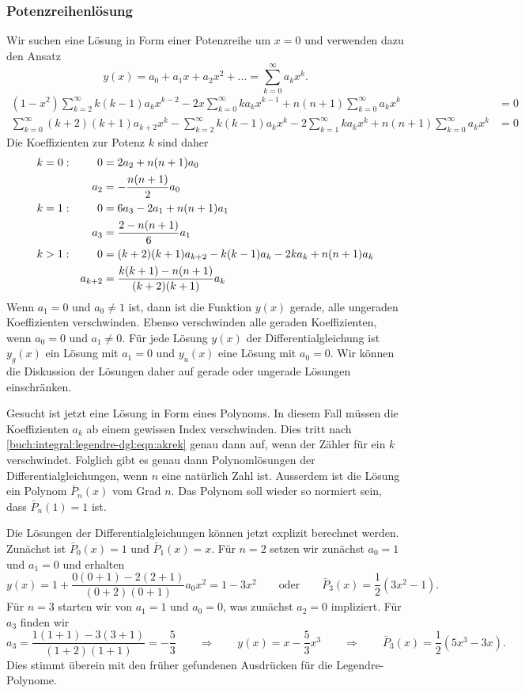 %
%
\subsubsection{Potenzreihenlösung}
Wir suchen eine Lösung in Form einer Potenzreihe um $x=0$ und 
verwenden dazu den Ansatz
\[
y(x) = a_0+a_1x+a_2x^2+ \dots = \sum_{k=0}^\infty a_kx^k.
\]
\begin{align*}
(1-x^2) \sum_{k=2}^\infty k(k-1)a_kx^{k-2}
-2x\sum_{k=0}^\infty ka_kx^{k-1}
+
n(n+1)\sum_{k=0}^\infty  a_kx^k
&=
0
\\
\sum_{k=0}^\infty (k+2)(k+1)a_{k+2}x^k
-
\sum_{k=2}^\infty k(k-1)a_kx^k
-
2\sum_{k=1}^\infty ka_kx^k
+
n(n+1)\sum_{k=0}^\infty  a_kx^k
&=
0
\end{align*}
Die Koeffizienten zur Potenz $k$ sind daher
\begin{align}
k&=0:
&
0&=
2a_2+n(n+1)a_0
\notag
\\
&&
a_2&=-\frac{n(n+1)}{2}a_0
\notag
\\
k&=1:
&
0&=
6a_3-2a_1+n(n+1)a_1
\notag
\\
&&
a_3&= \frac{2-n(n+1)}{6}a_1
\notag
\\
k&>1:
&
0&=
(k+2)(k+1)a_{k+2} -k(k-1)a_k -2ka_k +n(n+1) a_k
\notag
\\
&&
a_{k+2}
&=
\frac{ k(k+1)-n(n+1) }{(k+2)(k+1)}
a_k
\label{buch:integral:legendre-dgl:eqn:akrek}
\end{align}
Wenn $a_1=0$ und $a_0\ne 1$ ist, dann ist die Funktion $y(x)$ gerade,
alle ungeraden Koeffizienten verschwinden.
Ebenso verschwinden alle geraden Koeffizienten, wenn $a_0=0$ und $a_1\ne 0$.
Für jede Lösung $y(x)$ der Differentialgleichung ist
$y_g(x)$ ein Lösung mit $a_1=0$ und $y_u(x)$ eine Lösung mit $a_0=0$.
Wir können die Diskussion der Lösungen daher auf gerade oder ungerade
Lösungen einschränken.

Gesucht ist jetzt eine Lösung in Form eines Polynoms.
In diesem Fall müssen die Koeffizienten $a_k$ ab einem
gewissen Index verschwinden.
Dies tritt nach \eqref{buch:integral:legendre-dgl:eqn:akrek} genau
dann auf, wenn der Zähler für ein $k$ verschwindet.
Folglich gibt es genau dann Polynomlösungen der Differentialgleichungen,
wenn $n$ eine natürlich Zahl ist.
Ausserdem ist die Lösung ein Polynom $\bar{P}_n(x)$ vom Grad $n$.
Das Polynom soll wieder so normiert sein, dass $\bar{P}_n(1)=1$ ist.

Die Lösungen der Differentialgleichungen können jetzt explizit
berechnet werden.
Zunächst ist $\bar{P}_0(x)=1$ und $\bar{P}_1(x)=x$.
Für $n=2$ setzen wir zunächst $a_0=1$ und $a_1=0$ und erhalten
\[
y(x)
=
1 + \frac{0(0+1) - 2(2+1)}{(0+2)(0+1)}a_0 x^2
=
1
-3x^2
\qquad\text{oder}\qquad
\bar{P}_3(x) = \frac12(3x^2-1).
\]
Für $n=3$ starten wir von $a_1=1$ und $a_0=0$, was zunächst $a_2=0$
impliziert.
Für $a_3$ finden wir
\[
a_3=\frac{1(1+1)-3(3+1)}{(1+2)(1+1)} = -\frac53
\qquad\Rightarrow\qquad
y(x) = x-\frac53x^3
\qquad\Rightarrow\qquad
\bar{P}_3(x) = \frac12(5x^3-3x).
\]
Dies stimmt überein mit den früher gefundenen Ausdrücken für
die Legendre-Polynome.

